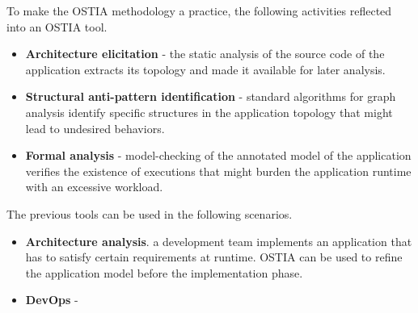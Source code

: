 {To make the OSTIA methodology a practice, the following activities reflected into an OSTIA tool.
\begin{itemize}
	\item \textbf{Architecture elicitation} - the static analysis of the source code of the application extracts its topology and made it available for later analysis.
	\item \textbf{Structural anti-pattern identification} - standard algorithms for graph analysis identify specific structures in the application topology that might lead to undesired behaviors.
	\item \textbf{Formal analysis} - model-checking of the annotated model of the application verifies the existence of executions that might burden the application runtime with an excessive workload.
\end{itemize}

\noindent
The previous tools can be used in the following scenarios.
\begin{itemize}
	\item \textbf{Architecture analysis}. a development team implements an application that has to satisfy certain requirements at runtime. OSTIA can be used to refine the application model before the implementation phase.
	\item \textbf{DevOps} - 
\end{itemize}
}